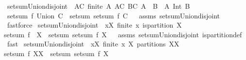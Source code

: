 \begin{isabellebody}
\endisatagproof
{\isafoldproof}%
%
\isadelimproof
%
\endisadelimproof
\isanewline
\isanewline
{}\isamarkupfalse%
\ setsum{\isacharunderscore}Union{\isacharunderscore}disjoint{\isacharunderscore}{}{\isacharcolon}\ \ {\isachardoublequoteopen}{\isasymforall}A{\isasymin}C{\isachardot}\ finite\ A{\isachardoublequoteclose}\ {\isachardoublequoteopen}{\isasymforall}A{\isasymin}C{\isachardot}\ {\isasymforall}B{\isasymin}C{\isachardot}\ A\ {\isasymnoteq}\ B\ {\isasymlongrightarrow}\ A\ Int\ B\ {\isacharequal}\ {\isacharbraceleft}{\isacharbraceright}{\isachardoublequoteclose}\ \isanewline
{}\ {\isachardoublequoteopen}setsum\ f\ {\isacharparenleft}Union\ C{\isacharparenright}\ {\isacharequal}\ setsum\ {\isacharparenleft}setsum\ f{\isacharparenright}\ C{\isachardoublequoteclose}%
\isadelimproof
\ %
\endisadelimproof
%
\isatagproof
{}\isamarkupfalse%
\ assms\ setsum{\isachardot}Union{\isacharunderscore}disjoint\ \isamarkupfalse%
\ fastforce%
\endisatagproof
{\isafoldproof}%
%
\isadelimproof
%
\endisadelimproof
\isanewline
\isanewline
\isanewline
{}\isamarkupfalse%
\ setsum{\isacharunderscore}Union{\isacharunderscore}disjoint{\isacharunderscore}{}{\isacharcolon}\ \ {\isachardoublequoteopen}{\isasymforall}x{\isasymin}X{\isachardot}\ finite\ x{\isachardoublequoteclose}\ {\isachardoublequoteopen}is{\isacharunderscore}partition\ X{\isachardoublequoteclose}\ \ \isanewline
{\isachardoublequoteopen}setsum\ f\ {\isacharparenleft}{\isasymUnion}\ X{\isacharparenright}\ {\isacharequal}\ setsum\ {\isacharparenleft}setsum\ f{\isacharparenright}\ X{\isachardoublequoteclose}%
\isadelimproof
\ %
\endisadelimproof
%
\isatagproof
{}\isamarkupfalse%
\ assms\ setsum{\isacharunderscore}Union{\isacharunderscore}disjoint{\isacharunderscore}{}\ is{\isacharunderscore}partition{\isacharunderscore}def\ \isamarkupfalse%
\ fast%
\endisatagproof
{\isafoldproof}%
%
\isadelimproof
%
\endisadelimproof
\isanewline
\isanewline
{}\isamarkupfalse%
\ setsum{\isacharunderscore}Union{\isacharunderscore}disjoint{\isacharunderscore}{}{\isacharcolon}\ \ {\isachardoublequoteopen}{\isasymforall}x{\isasymin}X{\isachardot}\ finite\ x{\isachardoublequoteclose}\ {\isachardoublequoteopen}X\ partitions\ XX{\isachardoublequoteclose}\ \isanewline
{\isachardoublequoteopen}setsum\ f\ XX\ {\isacharequal}\ setsum\ {\isacharparenleft}setsum\ f{\isacharparenright}\ X{\isachardoublequoteclose}%

\end{isabellebody}
